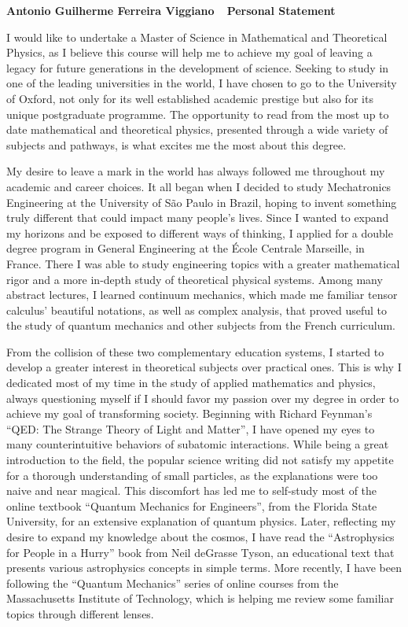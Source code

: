 \documentclass[10pt]{article}
\def\firstname{Antonio Guilherme }
\def\familyname{Ferreira Viggiano}
\def\FileTitle{\firstname\familyname~\textemdash~Personal Statement}
\newcommand*{\NEWLINE}{\vspace{0.75em}}
\begin{document}
\sffamily %

{\bfseries \FileTitle}
\NEWLINE{}\NEWLINE{}

I would like to undertake a Master of Science in Mathematical and Theoretical Physics, as I believe this course will help me to achieve my goal of leaving a legacy for future generations in the development of science. Seeking to study in one of the leading universities in the world, I have chosen to go to the University of Oxford, not only for its well established academic prestige but also for its unique postgraduate programme. The opportunity to read from the most up to date mathematical and theoretical physics, presented through a wide variety of subjects and pathways, is what excites me the most about this degree. \NEWLINE{}

My desire to leave a mark in the world has always followed me throughout my academic and career choices. It all began when I decided to study Mechatronics Engineering at the University of São Paulo in Brazil, hoping to invent something truly different that could impact many people's lives. Since I wanted to expand my horizons and be exposed to different ways of thinking, I applied for a double degree program in General Engineering at the École Centrale Marseille, in France. There I was able to study engineering topics with a greater mathematical rigor and a more in-depth study of theoretical physical systems. Among many abstract lectures, I learned continuum mechanics, which made me familiar tensor calculus' beautiful notations, as well as complex analysis, that proved useful to the study of quantum mechanics and other subjects from the French curriculum. \NEWLINE{}

From the collision of these two complementary education systems, I started to develop a greater interest in theoretical subjects over practical ones. This is why I dedicated most of my time in the study of applied mathematics and physics, always questioning myself if I should favor my passion over my degree in order to achieve my goal of transforming society. Beginning with Richard Feynman's ``QED: The Strange Theory of Light and Matter'', I have opened my eyes to many counterintuitive behaviors of subatomic interactions. While being a great introduction to the field, the popular science writing did not satisfy my appetite for a thorough understanding of small particles, as the explanations were too naive and near magical. This discomfort has led me to self-study most of the online textbook ``Quantum Mechanics for Engineers'', from the Florida State University, for an extensive explanation of quantum physics. Later, reflecting my desire to expand my knowledge about the cosmos, I have read the ``Astrophysics for People in a Hurry'' book from Neil deGrasse Tyson, an educational text that presents various astrophysics concepts in simple terms. More recently, I have been following the ``Quantum Mechanics'' series of online courses from the Massachusetts Institute of Technology, which is helping me review some familiar topics through different lenses.
\NEWLINE{}
\end{document}
